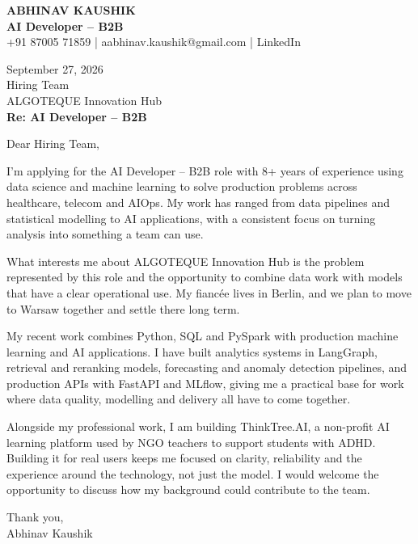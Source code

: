 \documentclass[10pt,a4paper]{article}
\begin{document}
\begin{center}
{\Large\bfseries ABHINAV KAUSHIK}\\[2pt]
{\bfseries AI Developer – B2B}\\[2pt]
+91 87005 71859 \quad | \quad aabhinav.kaushik@gmail.com \quad | \quad LinkedIn
\end{center}
\vspace{8pt}
September 27, 2026\\[6pt]
Hiring Team\\
ALGOTEQUE Innovation Hub\\[4pt]
\textbf{Re: AI Developer – B2B}

Dear Hiring Team,

I’m applying for the AI Developer – B2B role with 8+ years of experience using data science and machine learning to solve production problems across healthcare, telecom and AIOps. My work has ranged from data pipelines and statistical modelling to AI applications, with a consistent focus on turning analysis into something a team can use.

What interests me about ALGOTEQUE Innovation Hub is the problem represented by this role and the opportunity to combine data work with models that have a clear operational use. My fiancée lives in Berlin, and we plan to move to Warsaw together and settle there long term.

My recent work combines Python, SQL and PySpark with production machine learning and AI applications. I have built analytics systems in LangGraph, retrieval and reranking models, forecasting and anomaly detection pipelines, and production APIs with FastAPI and MLflow, giving me a practical base for work where data quality, modelling and delivery all have to come together.

Alongside my professional work, I am building ThinkTree.AI, a non-profit AI learning platform used by NGO teachers to support students with ADHD. Building it for real users keeps me focused on clarity, reliability and the experience around the technology, not just the model. I would welcome the opportunity to discuss how my background could contribute to the team.

Thank you,\\
Abhinav Kaushik
\end{document}
